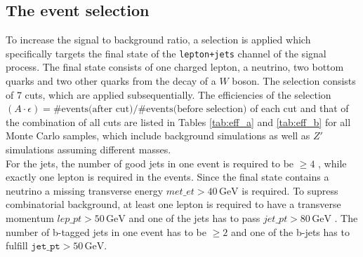 \subsection{The event selection}
To increase the signal to background ratio, a selection is applied which specifically targets the final state of the \texttt{lepton+jets}
channel of the signal process.
The final state consists of one charged lepton, a neutrino, two bottom quarks and two other quarks from the
decay of a $W$ boson. The selection consists of 7 cuts, which are applied subsequentially.
The efficiencies of the selection $(A \cdot \epsilon) = \# \text{events(after cut)} / \# \text{events(before selection)}$ of each cut and that of the combination of all cuts are listed in Tables \ref{tab:eff_a} and \ref{tab:eff_b} for all Monte Carlo samples, which include background simulations as well as $Z\prime$ simulations assuming different masses.\\
For the jets, the number of good jets in one event is required to be $\geq 4$
, while exactly one lepton is required
in the events. Since the final state contains a neutrino
a missing
transverse energy $met\_et > 40 \, \si{\giga\eV}$
 is required. To supress combinatorial background,
at least one lepton is required to have a transverse momentum $lep\_pt > 50 \, \si{\giga\eV}$
 and one of
the jets has to pass $jet\_pt > 80 \, \si{\giga\eV}$
. The number of b-tagged jets in one event has to be
$\geq 2$
 and one of the b-jets has to fulfill $\texttt{jet\_pt} > 50 \, \si{\giga\eV}$.%
